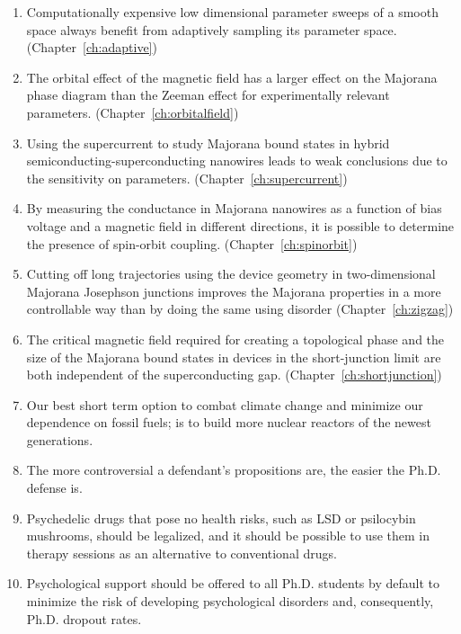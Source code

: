 \documentclass{dissertation}
\begin{document}
\begin{enumerate}

\item Computationally expensive low dimensional parameter sweeps of a smooth space always benefit from adaptively sampling its parameter space. (Chapter~\ref{ch:adaptive})

\item The orbital effect of the magnetic field has a larger effect on the Majorana phase diagram than the Zeeman effect for experimentally relevant parameters. (Chapter~\ref{ch:orbitalfield})

\item Using the supercurrent to study Majorana bound states in hybrid semiconducting-superconducting nanowires leads to weak conclusions due to the sensitivity on parameters. (Chapter~\ref{ch:supercurrent})

\item By measuring the conductance in Majorana nanowires as a function of bias voltage and a magnetic field in different directions, it is possible to determine the presence of spin-orbit coupling. (Chapter~\ref{ch:spinorbit})

\item Cutting off long trajectories using the device geometry in two-dimensional Majorana Josephson junctions improves the Majorana properties in a more controllable way than by doing the same using disorder (Chapter~\ref{ch:zigzag})

\item The critical magnetic field required for creating a topological phase and the size of the Majorana bound states in devices in the short-junction limit are both independent of the superconducting gap. (Chapter~\ref{ch:shortjunction})

\item Our best short term option to combat climate change and minimize our dependence on fossil fuels; is to build more nuclear reactors of the newest generations.

\item The more controversial a defendant's propositions are, the easier the Ph.D. defense is.

\item Psychedelic drugs that pose no health risks, such as LSD or psilocybin mushrooms, should be legalized, and it should be possible to use them in therapy sessions as an alternative to conventional drugs.

\item Psychological support should be offered to all Ph.D. students by default to minimize the risk of developing psychological disorders and, consequently, Ph.D. dropout rates.


\end{enumerate}
\end{document}
